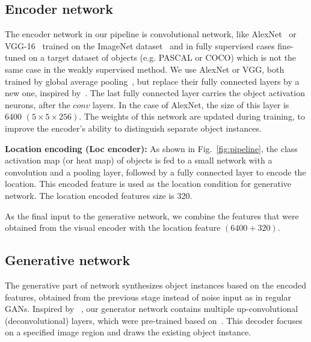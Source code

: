 \documentclass[runningheads]{llncs}
\begin{document}
\subsection{Encoder network}
The encoder network in our pipeline is convolutional network, like AlexNet~\cite{alexnet} or VGG-16~\cite{vgg} trained on the ImageNet dataset~\cite{imagenet} and in fully supervised cases fine-tuned on a target dataset of objects (e.g. PASCAL or COCO) which is not the same case in the weakly supervised method. We use AlexNet or VGG, both trained by global average pooling~\cite{gap}, but replace their fully connected layers by a new one, inspired by~\cite{pathak}. The last fully connected layer carries the object activation neurons, after the $conv$ layers. In the case of AlexNet, the size of this layer is 6400 $(5\times5\times256)$. The weights of this network are updated during training, to improve the encoder's ability to distinguish separate object instances.

\textbf{Location encoding (Loc encoder):}
As shown in Fig.~\ref{fig:pipeline}, the class activation map (or heat map) of objects is fed to a small network with a convolution and a pooling layer, followed by a fully connected layer to encode the location. This encoded feature is used as the location condition for generative network. The location encoded features size is 320.
 
As the final input to the generative network, we combine the features that were obtained from the visual encoder with the location feature $(6400+320)$.  

\subsection{Generative network}
The generative part of network synthesizes object instances based on the encoded features, obtained from the previous stage instead of noise input as in regular GANs. Inspired by ~\cite{dosovitskiy2,gap}, our generator network contains multiple up-convolutional (deconvolutional) layers, which were pre-trained based on~\cite{dosovitskiy2}. This decoder focuses on a specified image region and draws the existing object instance.
\end{document}

